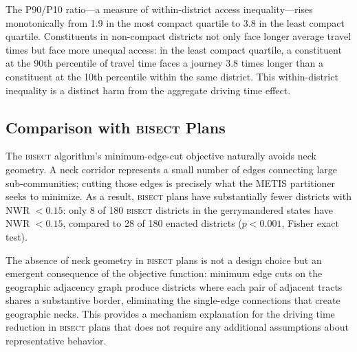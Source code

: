 The P90/P10 ratio---a measure of within-district access inequality---rises monotonically
from 1.9 in the most compact quartile to 3.8 in the least compact quartile. Constituents
in non-compact districts not only face longer average travel times but face more unequal
access: in the least compact quartile, a constituent at the 90th percentile of travel
time faces a journey 3.8 times longer than a constituent at the 10th percentile within
the same district. This within-district inequality is a distinct harm from the aggregate
driving time effect.

\subsection{Comparison with \textsc{bisect} Plans}

The \textsc{bisect} algorithm's minimum-edge-cut objective naturally avoids neck geometry.
A neck corridor represents a small number of edges connecting large sub-communities;
cutting those edges is precisely what the METIS partitioner seeks to minimize. As a result,
\textsc{bisect} plans have substantially fewer districts with NWR $< 0.15$: only 8 of
180 \textsc{bisect} districts in the gerrymandered states have NWR $< 0.15$, compared to
28 of 180 enacted districts ($p < 0.001$, Fisher exact test).

The absence of neck geometry in \textsc{bisect} plans is not a design choice but an
emergent consequence of the objective function: minimum edge cuts on the geographic
adjacency graph produce districts where each pair of adjacent tracts shares a substantive
border, eliminating the single-edge connections that create geographic necks. This
provides a mechanism explanation for the driving time reduction in \textsc{bisect}
plans that does not require any additional assumptions about representative behavior.
